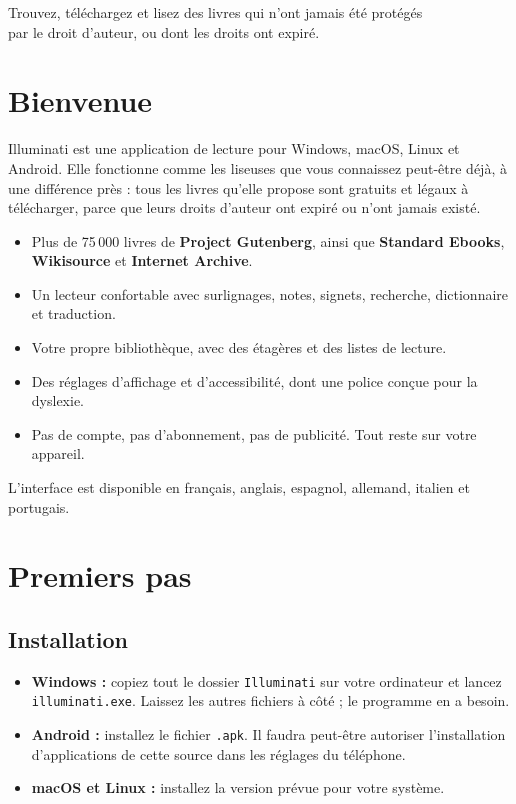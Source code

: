 \documentclass[11pt]{article}
\begin{document}
%
  {Trouvez, téléchargez et lisez des livres qui n’ont jamais été protégés\\par le droit d’auteur, ou dont les droits ont expiré.}

{\setcounter{tocdepth}{1}\tableofcontents}
\newpage

\section{Bienvenue}

Illuminati est une application de lecture pour Windows, macOS, Linux et Android. Elle fonctionne
comme les liseuses que vous connaissez peut-être déjà, à une différence près : tous les livres
qu’elle propose sont gratuits et légaux à télécharger, parce que leurs droits d’auteur ont expiré
ou n’ont jamais existé.

\begin{itemize}
  \item Plus de 75\,000 livres de \textbf{Project Gutenberg}, ainsi que \textbf{Standard Ebooks},
        \textbf{Wikisource} et \textbf{Internet Archive}.
  \item Un lecteur confortable avec surlignages, notes, signets, recherche, dictionnaire et
        traduction.
  \item Votre propre bibliothèque, avec des étagères et des listes de lecture.
  \item Des réglages d’affichage et d’accessibilité, dont une police conçue pour la dyslexie.
  \item Pas de compte, pas d’abonnement, pas de publicité. Tout reste sur votre appareil.
\end{itemize}

L’interface est disponible en français, anglais, espagnol, allemand, italien et portugais.

\section{Premiers pas}

\subsection{Installation}
\begin{itemize}
  \item \textbf{Windows :} copiez tout le dossier \texttt{Illuminati} sur votre ordinateur et
        lancez \texttt{illuminati.exe}. Laissez les autres fichiers à côté ; le programme en a
        besoin.
  \item \textbf{Android :} installez le fichier \texttt{.apk}. Il faudra peut-être autoriser
        l’installation d’applications de cette source dans les réglages du téléphone.
  \item \textbf{macOS et Linux :} installez la version prévue pour votre système.
\end{itemize}
\end{document}
